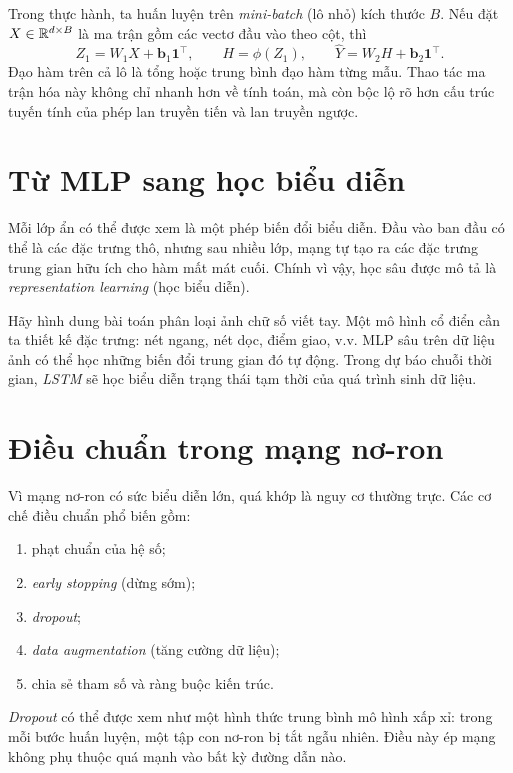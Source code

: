 Trong thực hành, ta huấn luyện trên \emph{mini-batch} (lô nhỏ) kích thước \(B\). Nếu đặt \(X\in\mathbb{R}^{d\times B}\) là ma trận gồm các vectơ đầu vào theo cột, thì
\[
Z_1=W_1X+\bm{b}_1 \mathbf{1}^\top,
\qquad
H=\phi(Z_1),
\qquad
\hat{Y}=W_2H+\bm{b}_2\mathbf{1}^\top.
\]
Đạo hàm trên cả lô là tổng hoặc trung bình đạo hàm từng mẫu. Thao tác ma trận hóa này không chỉ nhanh hơn về tính toán, mà còn bộc lộ rõ hơn cấu trúc tuyến tính của phép lan truyền tiến và lan truyền ngược.

\section{Từ MLP sang học biểu diễn}

Mỗi lớp ẩn có thể được xem là một phép biến đổi biểu diễn. Đầu vào ban đầu có thể là các đặc trưng thô, nhưng sau nhiều lớp, mạng tự tạo ra các đặc trưng trung gian hữu ích cho hàm mất mát cuối. Chính vì vậy, học sâu được mô tả là \emph{representation learning} (học biểu diễn).

Hãy hình dung bài toán phân loại ảnh chữ số viết tay. Một mô hình cổ điển cần ta thiết kế đặc trưng: nét ngang, nét dọc, điểm giao, v.v. MLP sâu trên dữ liệu ảnh có thể học những biến đổi trung gian đó tự động. Trong dự báo chuỗi thời gian, \emph{LSTM} sẽ học biểu diễn trạng thái tạm thời của quá trình sinh dữ liệu.

\section{Điều chuẩn trong mạng nơ-ron}

Vì mạng nơ-ron có sức biểu diễn lớn, quá khớp là nguy cơ thường trực. Các cơ chế điều chuẩn phổ biến gồm:

\begin{enumerate}
\item phạt chuẩn của hệ số;
\item \emph{early stopping} (dừng sớm);
\item \emph{dropout};
\item \emph{data augmentation} (tăng cường dữ liệu);
\item chia sẻ tham số và ràng buộc kiến trúc.
\end{enumerate}

\emph{Dropout} có thể được xem như một hình thức trung bình mô hình xấp xỉ: trong mỗi bước huấn luyện, một tập con nơ-ron bị tắt ngẫu nhiên. Điều này ép mạng không phụ thuộc quá mạnh vào bất kỳ đường dẫn nào.

